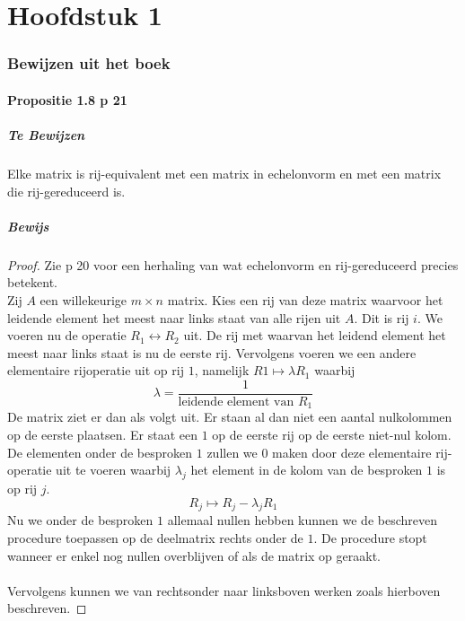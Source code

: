 \documentclass[lineaire_algebra_oplossingen.tex]{subfiles}
\begin{document}
\part{Hoofdstuk 1}

\section{Bewijzen uit het boek}
\subsection{Propositie 1.8 p 21}
\subsubsection*{Te Bewijzen}
Elke matrix is rij-equivalent met een matrix in echelonvorm en met een matrix die rij-gereduceerd is.
\subsubsection*{Bewijs}
\begin{proof}
Zie p 20 voor een herhaling van wat echelonvorm en rij-gereduceerd precies betekent.\\
Zij $A$ een willekeurige $m\times n$ matrix. Kies een rij van deze matrix waarvoor het leidende element het meest naar links staat van alle rijen uit $A$. Dit is rij $i$. We voeren nu de operatie $R_1 \leftrightarrow R_2$ uit. De rij met waarvan het leidend element het meest naar links staat is nu de eerste rij. Vervolgens voeren we een andere elementaire rijoperatie uit op rij $1$, namelijk $R1\longmapsto \lambda R_1$ waarbij 
\[
\lambda = \frac{1}{\text{leidende element van } R_1}
\]
De matrix ziet er dan als volgt uit. Er staan al dan niet een aantal nulkolommen op de eerste plaatsen. Er staat een $1$ op de eerste rij op de eerste niet-nul kolom.
De elementen onder de besproken $1$ zullen we $0$ maken door deze elementaire rij-operatie uit te voeren waarbij $\lambda_j$ het element in de kolom van de besproken $1$ is op rij $j$.
\[
R_j \longmapsto R_j - \lambda_jR_1
\]
Nu we onder de besproken $1$ allemaal nullen hebben kunnen we de beschreven procedure toepassen op de deelmatrix rechts onder de $1$. De procedure stopt wanneer er enkel nog nullen overblijven of als de matrix op geraakt.\\\\
Vervolgens kunnen we van rechtsonder naar linksboven werken zoals hierboven beschreven.
\end{proof}
\end{document}

